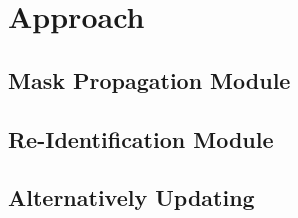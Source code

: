 \section{Approach}

\subsection{Mask Propagation Module}

\subsection{Re-Identification Module}

\subsection{Alternatively Updating}